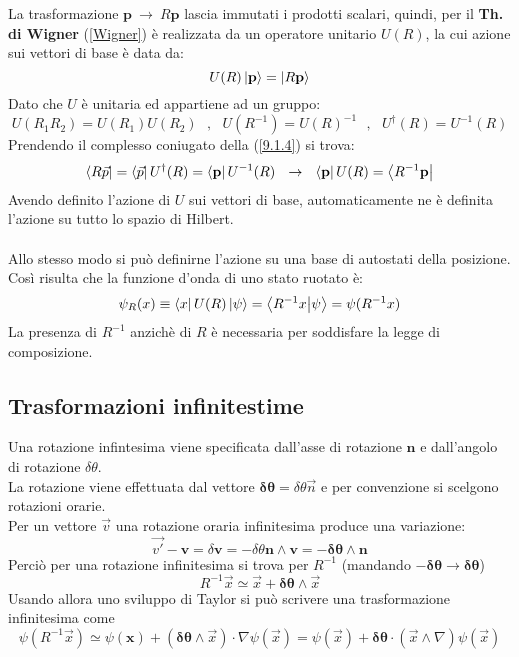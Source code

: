 \documentclass[twoside]{article}
\renewcommand{\vec}[1]{\textbf{#1}}
\begin{document}
La trasformazione $\vec{p} \ \rightarrow \ R\vec{p}$ lascia immutati i prodotti scalari, quindi, per il \textbf{Th. di Wigner} (\ref{Wigner}) è realizzata da un operatore unitario $U(R)$, la cui azione sui vettori di base è data da:
\begin{equation} \label{9.1.4}
    U(R)\ket{\vec{p}}=\ket{R\vec{p}}
\end{equation}
Dato che $U$ è unitaria ed appartiene ad un gruppo:
\begin{equation}
    U(R_1R_2)=U(R_1)U(R_2) \ \ \ , \ \ \ U(R^{-1})=U(R)^{-1} \ \ \ , \ \ \ U^{\dagger}(R)=U^{-1}(R)
\end{equation}
Prendendo il complesso coniugato della (\ref{9.1.4}) si trova:
\begin{equation}
    \bra{R\Vec{p}}=\bra{\Vec{p}}U^{\dagger}(R)=\bra{\vec{p}}U^{-1}(R) \ \ \rightarrow \ \ \bra{\vec{p}}U(R)=\bra{R^{-1}\vec{p}}
\end{equation}
Avendo definito l'azione di $U$ sui vettori di base, automaticamente ne è definita l'azione su tutto lo spazio di Hilbert.
\\ \\
Allo stesso modo si può definirne l'azione su una base di autostati della posizione.
\\
Così risulta che la funzione d'onda di uno stato ruotato è:
\begin{equation}
    \psi_R(x)\equiv \bra{x}U(R)\ket{\psi}=\bra{R^{-1}x}\ket{\psi}=\psi(R^{-1}x)
\end{equation}
La presenza di $R^{-1}$ anzichè di $R$ è necessaria per soddisfare la legge di composizione.

\subsection{Trasformazioni infinitestime}
Una rotazione infintesima viene specificata dall'asse di rotazione $\vec{n}$ e dall'angolo di rotazione $\delta \theta$.
\\
La rotazione viene effettuata dal vettore $\bm{\delta \theta}=\delta \theta \Vec{n}$ e per convenzione si scelgono rotazioni orarie.
\\
Per un vettore $\Vec{v}$ una rotazione oraria infinitesima produce una variazione:
\begin{equation}
    \Vec{v'}-\vec{v}=\delta \vec{v}=-\delta \theta \vec{n}\wedge \vec{v}=- \bm{\delta \theta}\wedge \vec{n}
\end{equation}
Perciò per una rotazione infinitesima si trova per $R^{-1}$ (mandando $-\bm{\delta \theta} \to \bm{\delta \theta}$)
\begin{equation}
    R^{-1}\Vec{x}\simeq \Vec{x}+\bm{\delta \theta}\wedge\Vec{x}
\end{equation}
Usando allora uno sviluppo di Taylor si può scrivere una trasformazione infinitesima come
\begin{equation}
    \psi(R^{-1}\Vec{x})\simeq \psi(\vec{x})+(\bm{\delta \theta}\wedge\Vec{x})\cdot \nabla\psi(\Vec{x})=\psi(\Vec{x})+\bm{\delta \theta}\cdot (\Vec{x}\wedge\nabla)\psi(\Vec{x})
\end{equation}
\end{document}
